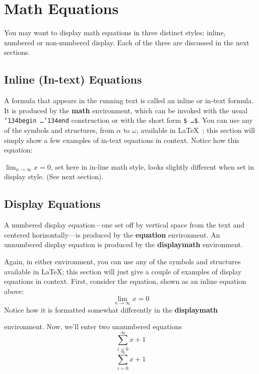 \documentclass[sigconf]{acmart}
\begin{document}
\section{Math Equations}
You may want to display math equations in three distinct styles:
inline, numbered or non-numbered display.  Each of
the three are discussed in the next sections. 


\subsection{Inline (In-text) Equations}
A formula that appears in the running text is called an
inline or in-text formula.  It is produced by the
\textbf{math} environment, which can be
invoked with the usual \texttt{{\char'134}begin\,\ldots{\char'134}end}
construction or with the short form \texttt{\$\,\ldots\$}. You
can use any of the symbols and structures,
from $\alpha$ to $\omega$, available in
\LaTeX~\cite{Lamport:LaTeX}; this section will simply show a
few examples of in-text equations in context. Notice how
this equation:

\begin{math}
  \lim_{n\rightarrow \infty}x=0
\end{math},
set here in in-line math style, looks slightly different when
set in display style.  (See next section).

\subsection{Display Equations}
A numbered display equation---one set off by vertical space from the
text and centered horizontally---is produced by the \textbf{equation}
environment. An unnumbered display equation is produced by the
\textbf{displaymath} environment.

Again, in either environment, you can use any of the symbols
and structures available in \LaTeX\@; this section will just
give a couple of examples of display equations in context.
First, consider the equation, shown as an inline equation above:
\begin{equation}
  \lim_{n\rightarrow \infty}x=0
\end{equation}
Notice how it is formatted somewhat differently in
the \textbf{displaymath}

environment.  Now, we'll enter two unnumbered equations
\begin{displaymath}
  \sum_{i=0}^{\infty} x + 1
\end{displaymath}
\begin{equation*}
  \sum_{i=0}^{\infty} x + 1
\end{equation*}
\end{document}
